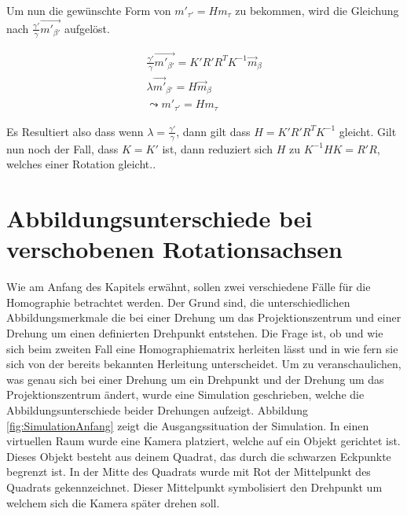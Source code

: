 Um nun die gewünschte Form von $m'_{\tau'} = Hm_{\tau}$ zu bekommen, wird die Gleichung nach $	\frac{\gamma'}{\gamma}\vec{m'_{\beta'}}$ aufgelöst.

\begin{gather}
	\frac{\gamma'}{\gamma}\vec{m'_{\beta'}} = K'R'R^TK^{-1}\vec{m}_\beta\\
\lambda \vec{m'}_{\beta'} = H\vec{m}_\beta\\
\leadsto m'_{\tau'} = H m_\tau
\end{gather}

Es Resultiert also dass wenn $\lambda = \frac{\gamma'}{\gamma}$, dann gilt dass $H = K'R'R^TK^{-1}$ gleicht. Gilt nun noch der Fall, dass $K = K'$ ist, dann reduziert sich $H$ zu $K^{-1}HK = R'R$, welches einer Rotation gleicht.\cite{Elements}. 




\section{Abbildungsunterschiede bei verschobenen Rotationsachsen}

Wie am Anfang des Kapitels erwähnt, sollen zwei verschiedene Fälle für die Homographie betrachtet werden. Der Grund sind, die unterschiedlichen Abbildungsmerkmale die bei einer Drehung um das Projektionszentrum und einer Drehung um einen definierten Drehpunkt entstehen. Die Frage ist, ob und wie sich beim zweiten Fall eine Homographiematrix herleiten lässt und in wie fern sie sich von der bereits bekannten Herleitung unterscheidet. Um zu veranschaulichen, was genau sich bei einer Drehung um ein Drehpunkt und der Drehung um das Projektionszentrum ändert, wurde eine Simulation geschrieben, welche die Abbildungsunterschiede beider Drehungen aufzeigt. Abbildung \ref{fig:SimulationAnfang} zeigt die Ausgangssituation der Simulation. In einen virtuellen Raum wurde eine Kamera platziert, welche auf ein Objekt gerichtet ist. Dieses Objekt besteht aus deinem Quadrat, das durch die schwarzen Eckpunkte begrenzt ist. In der Mitte des Quadrats wurde mit Rot der Mittelpunkt des Quadrats gekennzeichnet. Dieser Mittelpunkt symbolisiert den Drehpunkt um welchem sich die Kamera später drehen soll. 

